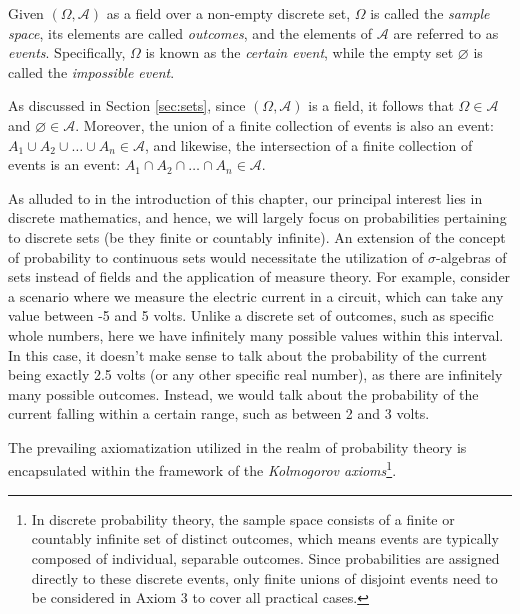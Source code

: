 \begin{definition}
Given $\left( \Omega, \mathcal{A} \right)$ as a field over a non-empty discrete set, $\Omega$ is called the \emph{sample space}, its elements are called \emph{outcomes}, and the elements of $\mathcal{A}$ are referred to as \emph{events}. Specifically, $\Omega$ is known as the \emph{certain event}, while the empty set $\varnothing$ is called the \emph{impossible event}.
\end{definition}

As discussed in Section \ref{sec:sets}, since $\left( \Omega, \mathcal{A} \right)$ is a field, it follows that $\Omega \in \mathcal{A}$ and $\varnothing \in \mathcal{A}$. Moreover, the union of a finite collection of events is also an event: $A_1 \cup A_2 \cup \ldots \cup A_n \in \mathcal{A}$, and likewise, the intersection of a finite collection of events is an event: $A_1 \cap A_2 \cap \ldots \cap A_n \in \mathcal{A}$.

















As alluded to in the introduction of this chapter, our principal interest lies in discrete mathematics, and hence, we will largely focus on probabilities pertaining to discrete sets (be they finite or countably infinite). An extension of the concept of probability to continuous sets would necessitate the utilization of $\sigma$-algebras of sets instead of fields and the application of measure theory. For example, consider a scenario where we measure the electric current in a circuit, which can take any value between -5 and 5 volts. Unlike a discrete set of outcomes, such as specific whole numbers, here we have infinitely many possible values within this interval. In this case, it doesn't make sense to talk about the probability of the current being exactly 2.5 volts (or any other specific real number), as there are infinitely many possible outcomes. Instead, we would talk about the probability of the current falling within a certain range, such as between 2 and 3 volts.

The prevailing axiomatization utilized in the realm of probability theory is encapsulated within the framework of the \emph{Kolmogorov axioms}\footnote{In discrete probability theory, the sample space consists of a finite or countably infinite set of distinct outcomes, which means events are typically composed of individual, separable outcomes. Since probabilities are assigned directly to these discrete events, only finite unions of disjoint events need to be considered in Axiom 3 to cover all practical cases.}.


